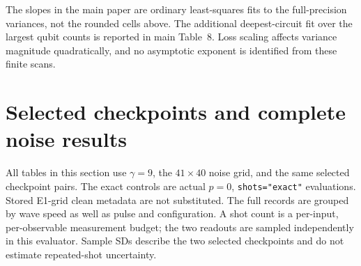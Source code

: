 \documentclass[11pt]{article}
\begin{document}
The slopes in the main paper are ordinary least-squares fits to the
full-precision variances, not the rounded cells above. The additional
deepest-circuit fit over the largest qubit counts is reported in main
Table~8. Loss scaling affects variance magnitude quadratically, and no
asymptotic exponent is identified from these finite scans.

\section{Selected checkpoints and complete noise results}

All tables in this section use $\gamma=9$, the $41\times40$ noise grid,
and the same selected checkpoint pairs. The exact controls are actual
$p=0$, \texttt{shots="exact"} evaluations. Stored E1-grid clean metadata
are not substituted. The full records are grouped by wave speed as well
as pulse and configuration. A shot count is a per-input, per-observable
measurement budget; the two readouts are sampled independently in this
evaluator. Sample SDs describe the two selected checkpoints and do not
estimate repeated-shot uncertainty.
\end{document}
